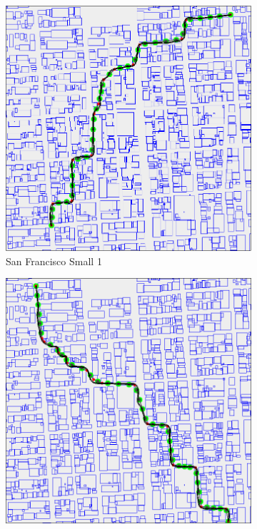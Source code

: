 \begin{figure}
	\begin{subfigure}[t]{0.46\textwidth}
        		\includegraphics[width=\textwidth]{img/sf-small-1}
        		\caption{San Francisco Small 1}
        		\label{fig:sf-small-1}
	\end{subfigure}
	\hfil	
	\begin{subfigure}[t]{0.46\textwidth}
        		\includegraphics[width=\textwidth]{img/sf-small-2}

\end{subfigure}
\end{figure}
